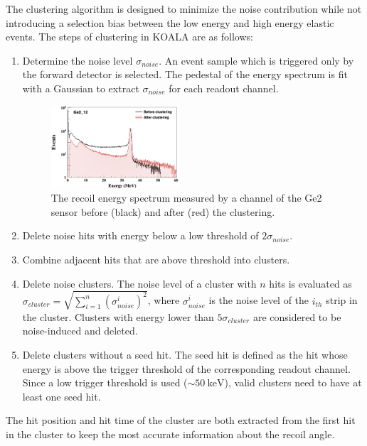 \documentclass[number,5p]{elsarticle}
\begin{document}
The clustering algorithm is designed to minimize the noise contribution while
not introducing a selection bias between the low energy and high energy elastic events.
The steps of clustering in KOALA are as follows:
\begin{enumerate}
\item Determine the noise level $\sigma_{noise}$. An event sample which is
  triggered only by the forward detector is selected.
  The pedestal of the energy spectrum is fit with a Gaussian to extract $\sigma_{noise}$ for each
  readout channel.
  \begin{figure}[b]
    \centering
    \includegraphics[width=0.45\textwidth]{./clustering.png}
    \caption{The recoil energy spectrum measured by a channel of the Ge2 sensor before (black) and after (red) the clustering.}
    \label{fig:clustering}
  \end{figure}
\item Delete noise hits with energy below a low threshold of $2\sigma_{noise}$.
\item Combine adjacent hits that are above threshold into clusters.
\item Delete noise clusters. The noise level of a cluster with $n$ hits is evaluated as
  $\sigma_{cluster} = \sqrt{\sum_{i=1}^n{(\sigma_{noise}^i)^2}}$, where $\sigma_{noise}^i$ is
  the noise level of the $i_{th}$ strip in the cluster. Clusters with energy lower than $5\sigma_{cluster}$ are considered to be noise-induced and deleted.
\item Delete clusters without a seed hit. The seed hit is defined as the
  hit whose energy is above the trigger threshold of the corresponding readout
  channel. Since a low trigger threshold is used ($\sim\SI{50}{\keV}$), valid clusters need to have at least one seed hit.
\end{enumerate}
The hit position and hit time of the cluster are both extracted from the first
hit in the cluster to keep the most accurate information about the recoil angle.
\end{document}
